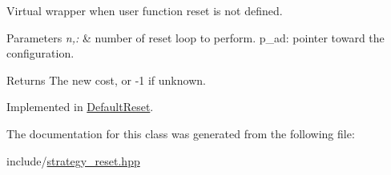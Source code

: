 \-Virtual wrapper when user function reset is not defined. 


\begin{DoxyParams}{\-Parameters}
{\em n,\-:} & number of reset loop to perform. p\-\_\-ad\-: pointer toward the configuration. \\
\hline
\end{DoxyParams}
\begin{DoxyReturn}{\-Returns}
\-The new cost, or -\/1 if unknown. 
\end{DoxyReturn}


\-Implemented in \hyperlink{classDefaultReset_a82e58336172b51b8a8ce0369cbfd0a55}{\-Default\-Reset}.



\-The documentation for this class was generated from the following file\-:\begin{DoxyCompactItemize}
\item 
include/\hyperlink{strategy__reset_8hpp}{strategy\-\_\-reset.\-hpp}\end{DoxyCompactItemize}
